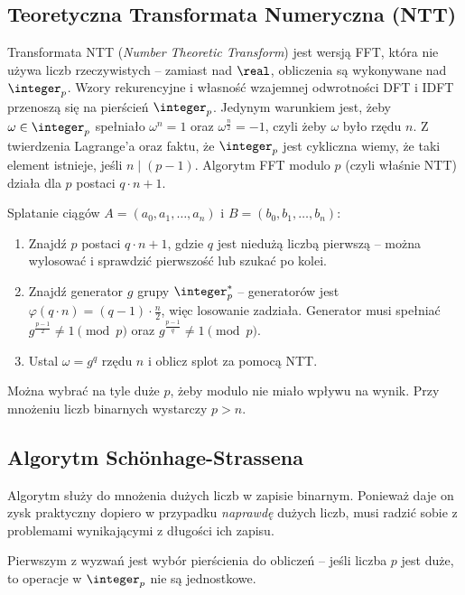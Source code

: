 \subsection{Teoretyczna Transformata Numeryczna (NTT)}
Transformata NTT (\textit{Number Theoretic Transform}) jest wersją FFT, która nie używa liczb rzeczywistych -- zamiast nad \( \real \), obliczenia są wykonywane nad \( \integer_p \).
Wzory rekurencyjne i własność wzajemnej odwrotności DFT i IDFT przenoszą się na pierścień \( \integer_p \). Jedynym warunkiem jest, żeby \( \omega \in \integer_p \) spełniało \( \omega^n = 1 \) oraz  \( \omega^{\frac{n}{2}} = -1 \), czyli żeby \( \omega \) było rzędu \( n \).
Z twierdzenia Lagrange'a oraz faktu, że \( \integer_p \) jest cykliczna wiemy, że taki element istnieje, jeśli \( n \mid (p - 1) \). Algorytm FFT modulo \( p \) (czyli właśnie NTT) działa dla \( p \) postaci \( q \cdot n + 1 \).

\begin{greyframe}
    Splatanie ciągów \( A = (a_0, a_1, \ldots, a_n) \) i \( B = (b_0, b_1, \ldots, b_n) \):
    \begin{enumerate}
        \item Znajdź \( p \) postaci \( q \cdot n + 1 \), gdzie \( q \) jest niedużą liczbą pierwszą -- można wylosować i sprawdzić pierwszość lub szukać po kolei.
        \item Znajdź generator \( g \) grupy \( \integer^{*}_p \) -- generatorów jest \( \varphi(q \cdot n) = (q - 1) \cdot \frac{n}{2} \), więc losowanie zadziała.
        Generator musi spełniać \( g^{\frac{p-1}{2}} \neq 1 \pmod{p} \) oraz \( g^{\frac{p-1}{q}} \neq 1 \pmod{p} \).
        \item Ustal \( \omega = g^q \) rzędu \( n \) i oblicz splot za pomocą NTT.
    \end{enumerate}
\end{greyframe}
Można wybrać na tyle duże \( p \), żeby modulo nie miało wpływu na wynik. Przy mnożeniu liczb binarnych wystarczy \( p > n \).

\subsection{Algorytm Sch{\"o}nhage-Strassena}
Algorytm służy do mnożenia dużych liczb w zapisie binarnym. Ponieważ daje on zysk praktyczny dopiero w przypadku \emph{naprawdę} dużych liczb, musi radzić sobie z problemami wynikającymi z długości ich zapisu.

Pierwszym z wyzwań jest wybór pierścienia do obliczeń -- jeśli liczba \( p \) jest duże, to operacje w \( \integer_p \) nie są jednostkowe.

